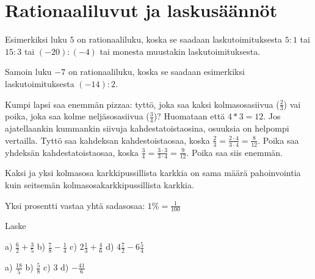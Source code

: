\chapter{Rationaaliluvut ja laskusäännöt}


Esimerkiksi luku $5$ on rationaaliluku, koska se saadaan laskutoimituksesta $5:1$ tai $15:3$ tai $(-20):(-4)$ tai monesta muustakin laskutoimituksesta.

Samoin luku $-7$ on rationaaliluku, koska se saadaan esimerkiksi laskutoimituksesta $(-14):2$.


Kumpi lapsi saa enemmän pizzaa: tyttö, joka saa kaksi kolmasosasiivua ($ \frac{2}{3}$) vai poika, joka saa kolme neljäsosasiivua ($ \frac{3}{4}$)? Huomataan että $4*3=12$. Jos ajatellaankin kummankin siivuja kahdestatoistaosina, osuuksia on helpompi vertailla. Tyttö saa kahdeksan kahdestoistaosaa, koska $ \frac{2}{3} = \frac{2 \cdot 4}{3 \cdot 4} = \frac{8}{12}$. Poika saa yhdeksän kahdestatoistaosaa, koska $ \frac{3}{4} = \frac{3 \cdot 3}{3 \cdot 4} = \frac{9}{12}$. Poika saa siis enemmän.



Kaksi ja yksi kolmasosa karkkipussillista karkkia on sama määrä pahoinvointia kuin seitsemän kolmasosakarkkipussillista karkkia.


Yksi prosentti vastaa yhtä sadasosaa: $1 \% = \frac{1}{100}$

Laske %
\begin{tehtava}
    a) $\frac{6}{2} + \frac{3}{5}$
    b) $\frac{7}{8} - \frac{1}{4}$
    c) $2 \frac{1}{3} + \frac{4}{6}$
    d) $4 \frac{7}{2} - 6 \frac{5}{4}$
    
    \begin{vastaus}
        a) $\frac{18}{5}$
        b) $\frac{5}{8}$
        c) $3$
        d) $-\frac{41}{6}$
    \end{vastaus}
\end{tehtava}

